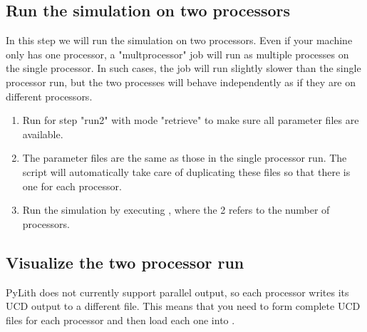 \subsection{Run the simulation on two processors}

In this step we will run the simulation on two processors. Even if
your machine only has one processor, a "multprocessor" job will run as
multiple processes on the single processor. In such cases, the job
will run slightly slower than the single processor run, but the two
processes will behave independently as if they are on different
processors.

\begin{enumerate}
\item Run  for step "run2" with mode "retrieve" to
  make sure all parameter files are available.

  \begin{screen}
    \shellprompt{}
  \end{screen}
  
\item The parameter files are the same as those in the single
  processor run. The  script will automatically take
  care of duplicating these files so that there is one for each
  processor.
\item Run the simulation by executing , where
  the 2 refers to the number of processors.

  \begin{screen}
    \shellprompt{}
  \end{screen}
\end{enumerate}

\subsection{Visualize the two processor run}

PyLith does not currently support parallel output, so each processor
writes its UCD output to a different file. This means that you need to
form complete UCD files for each processor and then load each one into
.


